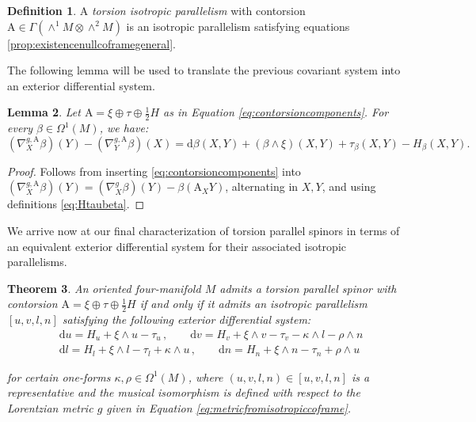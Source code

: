\documentclass[10pt,reqno,a4paper]{amsart}
\theoremstyle{plain}
\newtheorem{thm}{Theorem}[section]
\newtheorem{lemma}[thm]{Lemma}
\theoremstyle{definition}
\newtheorem{definition}[thm]{Definition}
\theoremstyle{remark}
\theoremstyle{remark}
\def\mA{\mathrm{A}}
\def\dd{\mathrm{d}}
\renewcommand{\(}{ (}
\renewcommand{\)}{ )}
\begin{document}
\begin{definition}
A \emph{torsion isotropic parallelism} with contorsion $\mA \in \Gamma(\wedge^1 M \otimes \wedge^2 M)$ is an isotropic parallelism satisfying equations \eqref{prop:existencenullcoframegeneral}.
\end{definition} 

\noindent
The following lemma will be used to translate the previous covariant system into an exterior differential system.

\begin{lemma}
\label{lemma:skewsymconnection}
Let $\mA = \xi \oplus \tau \oplus \frac12H$ as in Equation \eqref{eq:contorsioncomponents}.  For every $\beta\in\Omega^1(M)$, we have:
\begin{equation*} 
(\nabla^{g,\mA}_X\beta)(Y) - (\nabla^{g,\mA}_Y\beta)(X) =\dd\beta(X,Y)+(\beta\wedge\xi)(X,Y) + \tau_\beta(X,Y)-H_\beta(X,Y).
\end{equation*}
\end{lemma}

\begin{proof}
Follows from inserting \eqref{eq:contorsioncomponents} into $(\nabla^{g,\mA}_X\beta)(Y)=(\nabla^g_X\beta)(Y)-\beta(\mA_XY)$, alternating in $X,Y$, and using definitions \eqref{eq:Htaubeta}.
\end{proof}

\noindent
We arrive now at our final characterization of torsion parallel spinors in terms of an equivalent exterior differential system for their associated isotropic parallelisms.  

\begin{thm}
\label{thm:existencenullcoframeII}
An oriented four-manifold $M$ admits a torsion parallel spinor with contorsion $\mA = \xi \oplus \tau \oplus \frac{1}{2} H$ if and only if it admits an isotropic parallelism $[u,v,l,n]$ satisfying the following exterior differential system:
\begin{eqnarray}
& \dd u = H_{u} + \xi\wedge u - \tau_u  \, , \qquad \dd v = H_{v} + \xi\wedge v - \tau_v - \kappa\wedge l - \rho\wedge n   \label{eq:duvtorsiongeneral}\\
& \dd l = H_{l} + \xi\wedge l - \tau_l + \kappa\wedge u \, , \qquad \dd n = H_{n} + \xi\wedge n - \tau_n + \rho\wedge u   \label{eq:dlntorsiongeneral}
\end{eqnarray}

\noindent
for certain one-forms $\kappa,\rho\in\Omega^1(M)$, where $(u,v,l,n)\in [u,v,l,n]$ is a representative and the musical isomorphism is defined with respect to the Lorentzian metric $g$ given in Equation \eqref{eq:metricfromisotropiccoframe}.  
\end{thm}
\end{document}
